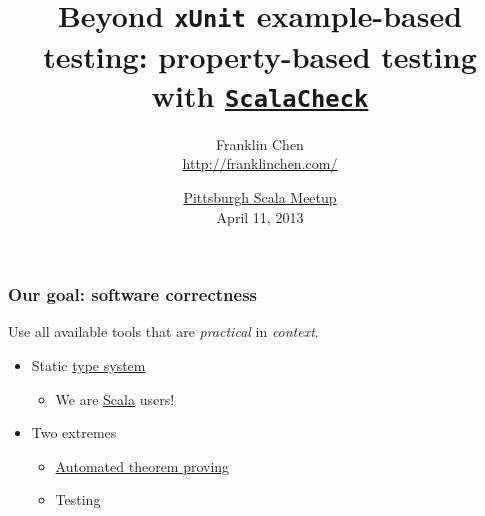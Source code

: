 \usepackage{minted}

\title{Beyond \texttt{xUnit} example-based testing: property-based testing with \href{https://github.com/rickynils/scalacheck}{\texttt{ScalaCheck}}}
\author{Franklin Chen \\ \url{http://franklinchen.com/}}
\date{\href{http://www.meetup.com/Pittsburgh-Scala-Meetup/events/108080782}{Pittsburgh Scala Meetup} \\
April 11, 2013
}



\begin{frame}
  \titlepage
\end{frame}


\begin{frame}
  \frametitle{Our goal: software correctness}

   Use all available tools that are \emph{practical} in \emph{context}.

  \begin{itemize}
    \item<2-> Static \href{http://en.wikipedia.org/wiki/Type\_system}{type system}
      \begin{itemize}
        \item<3-> We are \href{http://www.scala-lang.org/}{Scala} users!
      \end{itemize}
    \item<4-> Two extremes
      \begin{itemize}
        \item<5-> \href{http://en.wikipedia.org/wiki/Automated\_theorem\_proving}{Automated theorem proving}
        \item<6-> Testing
      \end{itemize}
  \end{itemize}

\end{frame}

